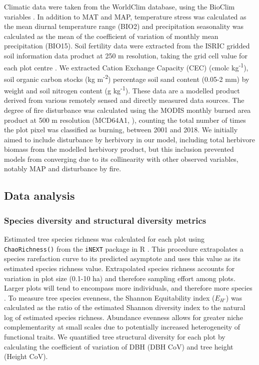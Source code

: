 \documentclass[11pt,a4paper]{article}
\begin{document}
Climatic data were taken from the WorldClim database, using the BioClim variables \citep{Fick2017}. In addition to MAT and MAP, temperature stress was calculated as the mean diurnal temperature range (BIO2) and precipitation seasonality was calculated as the mean of the coefficient of variation of monthly mean precipitation (BIO15). Soil fertility data were extracted from the ISRIC gridded soil information data product at 250 m resolution, taking the grid cell value for each plot centre \citep{Hengl2017}. We extracted Cation Exchange Capacity (CEC) (cmolc kg\textsuperscript{-1}), soil organic carbon stocks (kg m\textsuperscript{-2}) percentage soil sand content (0.05-2 mm) by weight and soil nitrogen content (g kg\textsuperscript{-1}). These data are a modelled product derived from various remotely sensed and directly measured data sources. The degree of fire disturbance was calculated using the MODIS monthly burned area product at 500 m resolution (MCD64A1, \citealt{MODIS_burn}), counting the total number of times the plot pixel was classified as burning, between 2001 and 2018. We initially aimed to include disturbance by herbivory in our model, including total herbivore biomass from the \citet{Hempson2017} modelled herbivory product, but this inclusion prevented models from converging due to its collinearity with other observed variables, notably MAP and disturbance by fire. 

\subsection{Data analysis}

\subsubsection{Species diversity and structural diversity metrics}

Estimated tree species richness was calculated for each plot using \verb|ChaoRichness()| from the \verb|iNEXT| package in R \citep{Hsieh2016}. This procedure extrapolates a species rarefaction curve to its predicted asymptote and uses this value as its estimated species richness value. Extrapolated species richness accounts for variation in plot size (0.1-10 ha) and therefore sampling effort among plots. Larger plots will tend to encompass more individuals, and therefore more species \citep{Dengler2009}. To measure tree species evenness, the Shannon Equitability index ($E_{H'}$) \citep{Smith1996} was calculated as the ratio of the estimated Shannon diversity index to the natural log of estimated species richness. Abundance evenness allows for greater niche complementarity at small scales due to potentially increased heterogeneity of functional traits. We quantified tree structural diversity for each plot by calculating the coefficient of variation of DBH (DBH CoV) and tree height (Height CoV). 
\end{document}
